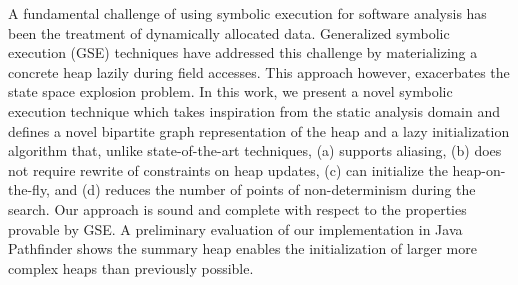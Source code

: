 A fundamental challenge of using symbolic execution for software
analysis has been the treatment of dynamically allocated
data. Generalized symbolic execution (GSE) techniques have addressed
this challenge by materializing a concrete heap lazily during field
accesses.  This approach however, exacerbates the state space
explosion problem.  In this work, we present a novel symbolic
execution technique which takes inspiration from the static analysis
domain and defines a novel bipartite graph representation of the heap
and a lazy initialization algorithm that, unlike state-of-the-art
techniques, (a) supports aliasing, (b) does not require rewrite of
constraints on heap updates, (c) can initialize the heap-on-the-fly,
and (d) reduces the number of points of non-determinism during the
search. Our approach is sound and complete with respect to the
properties provable by GSE. A preliminary evaluation of our
implementation in Java Pathfinder shows the summary heap enables the
initialization of larger more complex heaps than previously possible.

\begin{comment}
A fundamental challenge of using symbolic execution for software
analysis has been the treatment of dynamically allocated data.
State-of-the-art techniques have addressed this challenge through
either (a) the use of summaries that over-approximate possible heaps, or
(b) by materializing a concrete heap lazily during generalized
symbolic execution. In this work, we present a novel heap
initialization and analysis technique which takes inspiration from
both approaches and constructs precise heap summaries lazily during
symbolic execution.  Our approach is 1) \emph{scalable}: it reduces the
points of non-determinism compared to generalized symbolic execution
and explores each control-flow path only once for any given set of
isomorphic heaps, 2) \emph{precise}: at any given point during symbolic
execution, the symbolic heap represents the exact set of feasible
concrete heap structures for the program under analysis, and 3)
\emph{expressive}: the symbolic heap can represent recursive data
structures. We demonstrate the precision and scalability of our
approach by implementing it as an extension to the Symbolic PathFinder
framework for analyzing Java programs.
\end{comment}


